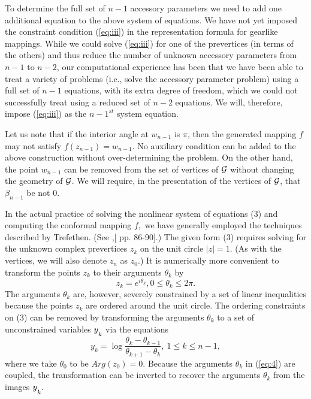 \documentclass[12pt]{article}%
\begin{document}
To determine the full set of $n-1$ accessory parameters we need to
add one additional equation to the above system of equations.  We
have not yet imposed the constraint condition (\ref{eq:iii}) in the
representation formula for gearlike mappings.  While we could solve
(\ref{eq:iii}) for one of the prevertices (in terms of the others)
and thus reduce the number of unknown accessory parameters from $n-1$
to $n-2$, our computational experience has been that we have been
able to treat a variety of problems (i.e., solve the accessory
parameter problem) using a full set of $n-1$ equations, with its
extra degree of freedom, which we could not successfully treat using
a reduced set of $n-2$ equations.  We will, therefore, impose
(\ref{eq:iii}) as the $n-1^{st}$ system equation.

Let us note that if the interior angle at $w_{n-1}$ is $\pi$,
then the generated mapping $f$ may not satisfy $f(z_{n-1}) = w_{n-1}$.
 No auxiliary condition can be added to the above construction
without over-determining the problem. On the other hand, the point
$w_{n-1}$ can be removed from the set of vertices of ${\cal G}$
without changing the geometry of ${\cal G}$.  We will require, in the
presentation of the vertices of ${\cal G}$, that $\beta_{n-1}$ be not
$0$.\vspace*{12pt}

\renewcommand{\theequation}{\arabic{equation}}\setcounter{equation}{3}
\vspace*{12pt}

In the actual practice of solving the nonlinear system of equations
(3) and computing the conformal mapping $f,$ we have generally
employed the techniques described by Trefethen.  (See \cite{10},[ pp.
86-90].)  The given form (3) requires solving for the unknown complex
prevertices $z_k$ on the unit circle $|z| = 1.$ (As with the
vertices, we will also denote $z_n$ as $z_0.$) It is numerically more
convenient to transform the points $z_k$ to their arguments
$\theta_k$ by 
$$z_k=e^{i\theta_k}, 0\leq\theta_k\leq 2\pi.$$ The
arguments $\theta_k$ are, however, severely constrained by a set of
linear inequalities because the points $z_k$ are ordered around the
unit circle.  The ordering constraints on (3) can be removed by
transforming the arguments $\theta_k$ to a set of unconstrained
variables $y\lower 5pt\hbox{$\scriptstyle k$}$ via the equations
\begin{equation}
y_k=\log\frac{\theta_k-\theta_{k-1}}{\theta_{k+1}-\theta_k}, \ 1\leq
k\leq n-1,\label{eq:4}\end{equation} where we take $\theta_0$ to be
$Arg(z_0) = 0$.  Because the arguments $\theta_k$ in (\ref{eq:4}) are
coupled, the transformation can be inverted to recover the arguments
$\theta_k$ from the images $y\lower 5pt\hbox{$\scriptstyle k$}$.
\end{document}
